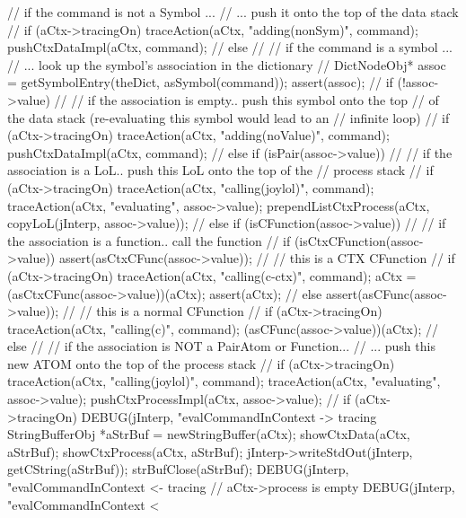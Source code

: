 {{{      // if the command is not a Symbol ...
      //  ...  push it onto the top of the data stack
      //
      if (aCtx->tracingOn)
        traceAction(aCtx, "adding(nonSym)", command);
      pushCtxDataImpl(aCtx, command);
      //
    } else {
      //
      // if the command is a symbol ...
      //  ... look up the symbol's association in the dictionary
      //
      DictNodeObj* assoc = getSymbolEntry(theDict, asSymbol(command));
      assert(assoc);
      //
      if (!assoc->value) {
        //
        // if the association is empty.. push this symbol onto the top
        // of the data stack (re-evaluating this symbol would lead to an
        // infinite loop)
        //
        if (aCtx->tracingOn)
          traceAction(aCtx, "adding(noValue)", command);
        pushCtxDataImpl(aCtx, command);
        //
      } else if (isPair(assoc->value)) {
        //
        // if the association is a LoL.. push this LoL onto the top of the
        // process stack
        //
        if (aCtx->tracingOn) {
          traceAction(aCtx, "calling(joylol)", command);
          traceAction(aCtx, "evaluating", assoc->value);
        }
        prependListCtxProcess(aCtx,
          copyLoL(jInterp, assoc->value));
        //
      } else if (isCFunction(assoc->value)) {
        //
        // if the association is a function.. call the function
        //
        if (isCtxCFunction(assoc->value)) {
          assert(asCtxCFunc(assoc->value));
          //
          // this is a CTX CFunction
          //
          if (aCtx->tracingOn) 
            traceAction(aCtx, "calling(c-ctx)", command);
          aCtx = (asCtxCFunc(assoc->value))(aCtx);
          assert(aCtx);
          //
        } else {
          assert(asCFunc(assoc->value));
          //
          // this is a normal CFunction
          //
          if (aCtx->tracingOn)
            traceAction(aCtx, "calling(c)", command);
          (asCFunc(assoc->value))(aCtx);
          //
        }
      } else {
        //
        // if the association is NOT a PairAtom or Function...
        // ... push this new ATOM onto the top of the process stack
        //
        if (aCtx->tracingOn) {
          traceAction(aCtx, "calling(joylol)", command);
          traceAction(aCtx, "evaluating", assoc->value);
        }
        pushCtxProcessImpl(aCtx, assoc->value);
        //
      }
    }
    if (aCtx->tracingOn) {
      DEBUG(jInterp, "evalCommandInContext -> tracing%
      StringBufferObj *aStrBuf = newStringBuffer(aCtx);
      showCtxData(aCtx, aStrBuf);
      showCtxProcess(aCtx, aStrBuf);
      jInterp->writeStdOut(jInterp, getCString(aStrBuf));
      strBufClose(aStrBuf);
      DEBUG(jInterp, "evalCommandInContext <- tracing%
    }
  } // aCtx->process is empty
  DEBUG(jInterp, "evalCommandInContext < %
}
\stopCCode

